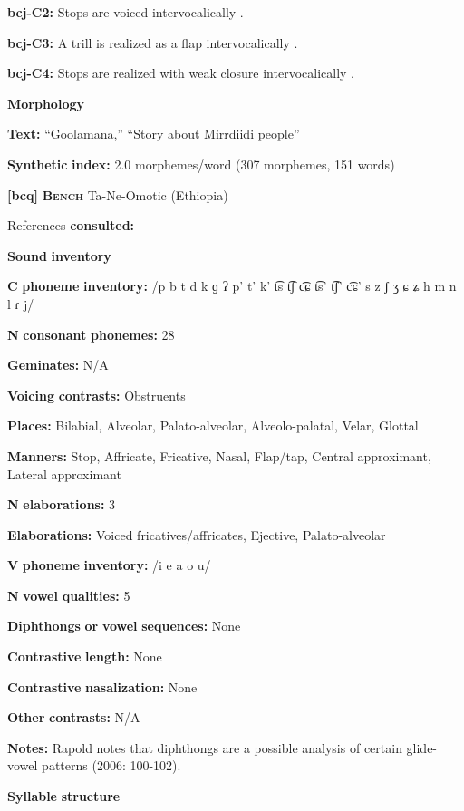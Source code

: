\begin{styleBody}
\textbf{bcj-C2:}  Stops are voiced intervocalically \citep[76]{Bowern2012}.

\textbf{bcj-C3:} A trill is realized as a flap intervocalically \citep[81]{Bowern2012}.

\textbf{bcj-C4:} Stops are realized with weak closure intervocalically \citep[78]{Bowern2012}.

\textbf{Morphology}

\textbf{Text:} “Goolamana,” “Story about Mirrdiidi people” \citep[704-710]{Bowern2012}

\textbf{Synthetic} \textbf{index:} 2.0 morphemes/word (307 morphemes, 151 words)

\textbf{[bcq]}   \textbf{\textsc{Bench}  }  Ta-Ne-Omotic (Ethiopia)

References \textbf{consulted:} \citet{Rapold2006}

\textbf{Sound} \textbf{inventory}

\textbf{C} \textbf{phoneme} \textbf{inventory:} /p b t d k ɡ ʔ p’ t’ k’ t͡s t͡ʃ c͡ɕ t͡s’ t͡ʃ’ c͡ɕ’ s z ʃ ʒ ɕ ʑ h m n l ɾ j/

\textbf{N} \textbf{consonant} \textbf{phonemes:} 28

\textbf{Geminates:} N/A

\textbf{Voicing} \textbf{contrasts:} Obstruents

\textbf{Places:} Bilabial, Alveolar, Palato-alveolar, Alveolo-palatal, Velar, Glottal

\textbf{Manners:} Stop, Affricate, Fricative, Nasal, Flap/tap, Central approximant, Lateral approximant

\textbf{N} \textbf{elaborations:} 3

\textbf{Elaborations:} Voiced fricatives/affricates, Ejective, Palato-alveolar

\textbf{V} \textbf{phoneme} \textbf{inventory:} /i e a o u/

\textbf{N} \textbf{vowel} \textbf{qualities:} 5

\textbf{Diphthongs} \textbf{or} \textbf{vowel} \textbf{sequences:} None

\textbf{Contrastive} \textbf{length:} None

\textbf{Contrastive} \textbf{nasalization:} None

\textbf{Other} \textbf{contrasts:} N/A

\textbf{Notes:} Rapold notes that diphthongs are a possible analysis of certain glide-vowel patterns (2006: 100-102).

\textbf{Syllable} \textbf{structure}


\end{styleBody}
